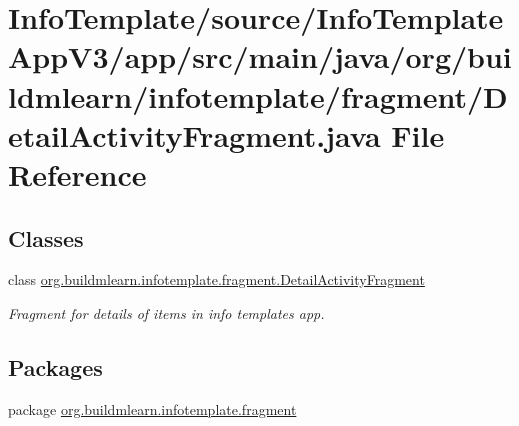 \hypertarget{InfoTemplate_2source_2InfoTemplateAppV3_2app_2src_2main_2java_2org_2buildmlearn_2infotemplate_2f97fa1c29ed126df6b9893c55cb59dfb1}{}\section{Info\+Template/source/\+Info\+Template\+App\+V3/app/src/main/java/org/buildmlearn/infotemplate/fragment/\+Detail\+Activity\+Fragment.java File Reference}
\label{InfoTemplate_2source_2InfoTemplateAppV3_2app_2src_2main_2java_2org_2buildmlearn_2infotemplate_2f97fa1c29ed126df6b9893c55cb59dfb1}
\subsection*{Classes}
\begin{DoxyCompactItemize}
\item 
class \hyperlink{classorg_1_1buildmlearn_1_1infotemplate_1_1fragment_1_1DetailActivityFragment}{org.\+buildmlearn.\+infotemplate.\+fragment.\+Detail\+Activity\+Fragment}
\begin{DoxyCompactList}\small\item\em Fragment for details of items in info template\textquotesingle{}s app. \end{DoxyCompactList}\end{DoxyCompactItemize}
\subsection*{Packages}
\begin{DoxyCompactItemize}
\item 
package \hyperlink{namespaceorg_1_1buildmlearn_1_1infotemplate_1_1fragment}{org.\+buildmlearn.\+infotemplate.\+fragment}
\end{DoxyCompactItemize}
